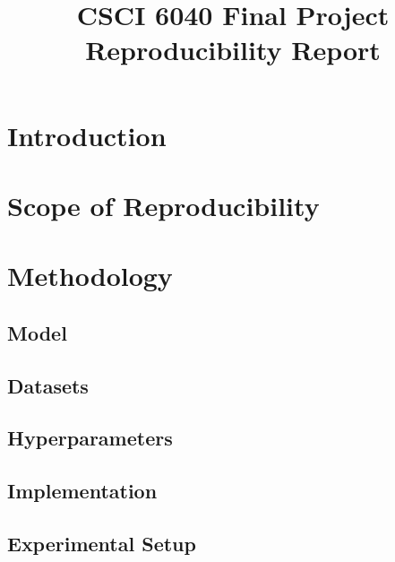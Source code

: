 \documentclass[conference]{IEEEtran}
\begin{document}
\title{CSCI 6040 Final Project\\Reproducibility Report}

\author{
\and
{}
\and
{}
}

\maketitle

\section{Introduction}

\section{Scope of Reproducibility}

\section{Methodology}

\subsection{Model}  

\subsection{Datasets}  

\subsection{Hyperparameters}  

\subsection{Implementation}

\subsection{Experimental Setup}
\end{document}

